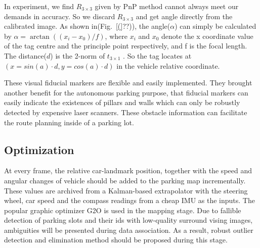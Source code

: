 \documentclass[journal]{IEEEtran}
\newcommand{\Reffig}[1]{Fig.~\ref{#1}}
\begin{document}
In experiment, we find ${R}_{3 \times 3}$ given by PnP method cannot always meet our demands in accuracy.
So we discard ${R}_{3 \times 3}$ and get angle directly from the calibrated image.
As shown in(\Reffig(??)), the angle($\alpha$) can simply be calculated by $\alpha = \arctan((x_i - x_0) / f)$, where $x_i$ and $x_0$ denote the x coordinate value of the tag centre and the principle point respectively, and f is the focal length.
The distance($d$) is the 2-norm of ${t}_{3 \times 1}$ . 
So the tag locates at $( x=sin(a) \cdot d, y=cos(a) \cdot d)$ in the vehicle relative coordinate.

These visual fiducial markers are flexible and easily implemented.
They brought another benefit for the autonomous parking purpose, that fiducial markers can easily indicate the existences of pillars and walls which can only be robustly detected by expensive laser scanners.
These obstacle information can facilitate the route planning inside of a parking lot. 

\subsection{Optimization}

At every frame, the relative car-landmark position, together with the speed and angular changes of vehicle should be added to the parking map incrementally. 
These values are archived from a Kalman-based extrapolator with the steering wheel, car speed and the compass readings from a cheap IMU as the inputs.
The popular graphic optimizer G2O is used in the mapping stage\citep{K2011G2o}.
Due to fallible detection of parking slots and their ids with low-quality surround vising images, ambiguities will be presented during data association.
As a result, robust outlier detection and elimination method should be proposed during this stage.
\end{document}
